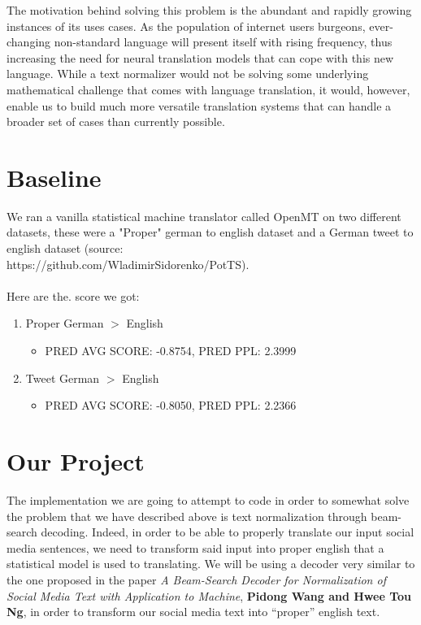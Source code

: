 \documentclass{article}
\begin{document}
The motivation behind solving this problem is the abundant and rapidly growing instances of its uses cases. As the population of internet users burgeons, ever-changing non-standard language will present itself with rising frequency, thus increasing the need for neural translation models that can cope with this new language. While a text normalizer would not be solving some underlying mathematical challenge that comes with language translation, it would, however, enable us to build much more versatile translation systems that can handle a broader set of cases than currently possible.   

\section{Baseline}

We ran a vanilla statistical machine translator called OpenMT on two different datasets, these were a "Proper" german to english dataset and a German tweet to english dataset (source: \\https://github.com/WladimirSidorenko/PotTS). \\\\Here are the. score we got:
\begin{enumerate}
	\item Proper German $>$ English
		\begin{itemize}
			\item PRED AVG SCORE: -0.8754, PRED PPL: 2.3999
		\end{itemize}
	\item Tweet German $>$ English
	\begin{itemize}
			\item PRED AVG SCORE: -0.8050, PRED PPL: 2.2366
		\end{itemize}
\end{enumerate}



\section{Our Project}
The implementation we are going to attempt to code in order to somewhat solve the problem that we have described above is text normalization through beam-search decoding. Indeed, in order to be able to properly translate our input social media sentences, we need to transform said input into proper english that a statistical model is used to translating. We will be using a decoder very similar to the one proposed in the paper  \textit{A Beam-Search Decoder for Normalization of Social Media Text with Application to Machine}, \textbf{Pidong Wang and Hwee Tou Ng}, in order to transform our social media text into “proper” english text. \\
\end{document}
